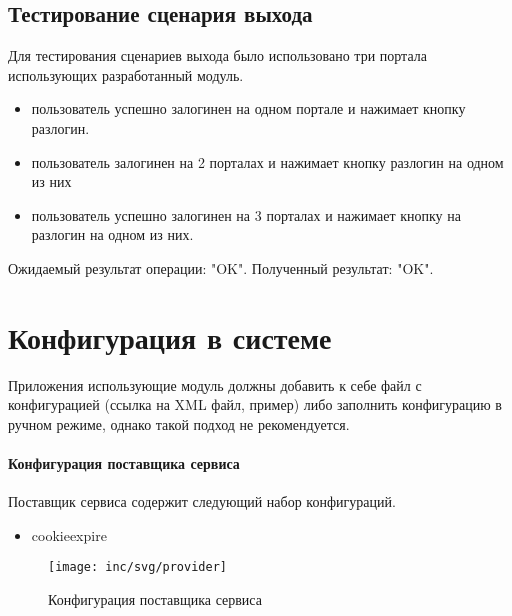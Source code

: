 \subsection{Тестирование сценария выхода}
Для тестирования сценариев выхода было использовано три портала использующих разработанный модуль.
\begin{itemize}
\item пользователь успешно залогинен на одном портале и нажимает кнопку разлогин.
\item пользователь залогинен на 2 порталах и нажимает кнопку разлогин на одном из них
\item пользователь успешно залогинен на 3 порталах и нажимает кнопку на разлогин на одном из них.
\end{itemize}

Ожидаемый результат операции: "OK". 
Полученный результат: "OK".

%
%

\section{Конфигурация в системе}

Приложения использующие модуль должны добавить к себе файл с конфигурацией (ссылка на XML файл, пример) либо заполнить конфигурацию в ручном режиме, однако такой подход не рекомендуется.

\paragraph{Конфигурация поставщика сервиса}
Поставщик сервиса содержит следующий набор конфигураций.
\begin{itemize}
\item cookieexpire
\end{itemize}

\begin{figure}[H]
  \centering
  \texttt{[image: inc/svg/provider]}
  \caption{Конфигурация поставщика сервиса}
  \label{fig:runConfig}
\end{figure}

